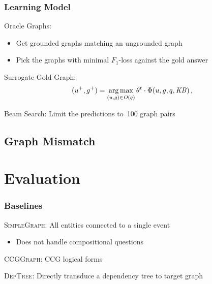 \documentclass[mathserif,12pt]{beamer}
\newcommand{\argmax}{\operatornamewithlimits{arg\,max}}
\newcommand{\hlight}[1]{{\color{blue!80} #1}}
\newcommand \deptree{\textsc{DepTree}\xspace}
\newcommand \simplegraph{\textsc{SimpleGraph}\xspace}
\newcommand \ccggraph{\textsc{CCGGraph}\xspace}
\begin{document}
\begin{frame}
\frametitle{Learning Model}

\hlight{Oracle Graphs: } 
\begin{itemize}
 \item[] Get grounded graphs matching an ungrounded graph
 \item[] Pick the graphs with minimal $F_1$-loss against the gold answer
\end{itemize}

\vspace{0.5cm}
\hlight{Surrogate Gold Graph: }
$$(u^{+},{g^{+}}) = \argmax_{(u,g) \in \mathit{O}(q)} \theta^{t} \cdot \Phi({u,g,q,\mathit{KB}})\,,$$

\vspace{0.5cm}
\hlight{Beam Search: } Limit the predictions to~100 graph pairs
\end{frame}

\subsection{Graph Mismatch}

\section{Evaluation}

\begin{frame}
\frametitle{Baselines}
\hlight{\simplegraph: }All entities connected to a single event
\begin{itemize}
 \item Does not handle compositional questions%
\end{itemize}

\pause

\vspace{0.9cm} 
\hlight{\ccggraph: } CCG logical forms 

\pause
\vspace{0.9cm}
\hlight{\deptree:} Directly transduce a dependency tree to target graph \\

\end{frame}
\end{document}
